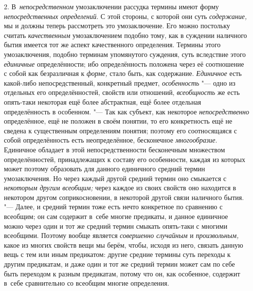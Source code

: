2. В~{\em непосредственном}
умозаключении рассудка термины имеют форму
{\em непосредственных определений}.
С этой стороны, с которой они суть
{\em содержание,} мы и
должны теперь рассмотреть это умозаключение. Его можно постольку считать
{\em качественным}
умозаключением подобно тому, как в суждении наличного бытия
имеется тот же аспект качественного определения. Термины этого
умозаключения, подобно терминам упомянутого суждения, суть вследствие этого
{\em единичные}
определённости; ибо определённость положена через её
соотношение с собой как безразличная к
{\em форме,} стало быть,
как содержание. {\em Единичное}
есть какой-либо непосредственный, конкретный предмет,
{\em особенность} "--- одно
из отдельных его определённостей, свойств или отношений,
{\em всеобщность} же есть
опять-таки некоторая ещё более абстрактная, ещё более отдельная
определённость в особенном. "--- Так как субъект, как некоторое
{\em непосредственно}
определённое, ещё не положен в своём понятии, то его
конкретность ещё не сведена к существенным определениям понятия; поэтому
его соотносящаяся с собой определённость есть
неопределённое, бесконечное
{\em многообразие}.
Единичное обладает в этой непосредственности бесконечным
множеством определённостей, принадлежащих к составу его особенности, каждая
из которых может поэтому образовать для данного единичного средний термин
умозаключения. Но через каждый другой средний термин оно смыкается с
{\em некоторым другим всеобщим;}
через каждое из своих свойств оно находится в некотором
другом соприкосновении, в некоторой другой связи наличного бытия. "---
Далее, и средний термин тоже есть нечто конкретное по
сравнению с всеобщим; он сам содержит в~себе многие предикаты, и данное
единичное можно через один и тот же средний термин смыкать опять-таки с
многими всеобщими. Поэтому вообще является
{\em совершенно случайным}
и {\em произвольным,}
какое из многих свойств вещи мы берём, чтобы, исходя из него,
связать данную вещь с тем или иным предикатом: другие средние термины суть
переходы к другим предикатам, и даже один и тот же средний термин может сам
по себе быть переходом к разным предикатам, потому что он, как особенное,
содержит в~себе сравнительно со всеобщим многие определения.

